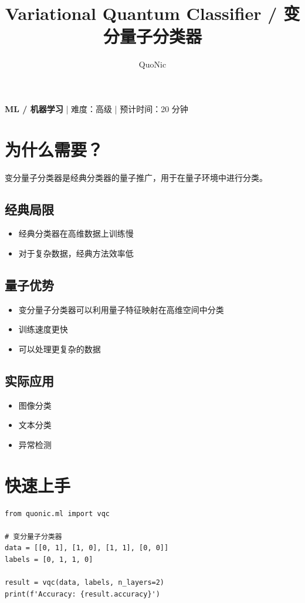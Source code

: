 \documentclass[12pt,a4paper]{article}
\title{Variational Quantum Classifier / 变分量子分类器}
\author{QuoNic}
\date{}
\begin{document}
\maketitle

\begin{center}
\textbf{ML / 机器学习} | 难度：高级 | 预计时间：20 分钟
\end{center}

\tableofcontents
\newpage

\section{为什么需要？}

变分量子分类器是经典分类器的量子推广，用于在量子环境中进行分类。

\subsection{经典局限}
\begin{itemize}
  \item 经典分类器在高维数据上训练慢
  \item 对于复杂数据，经典方法效率低
\end{itemize}

\subsection{量子优势}
\begin{itemize}
  \item 变分量子分类器可以利用量子特征映射在高维空间中分类
  \item 训练速度更快
  \item 可以处理更复杂的数据
\end{itemize}

\subsection{实际应用}
\begin{itemize}
  \item 图像分类
  \item 文本分类
  \item 异常检测
\end{itemize}

\section{快速上手}

\begin{verbatim}
from quonic.ml import vqc

# 变分量子分类器
data = [[0, 1], [1, 0], [1, 1], [0, 0]]
labels = [0, 1, 1, 0]

result = vqc(data, labels, n_layers=2)
print(f'Accuracy: {result.accuracy}')
\end{verbatim}
\end{document}
